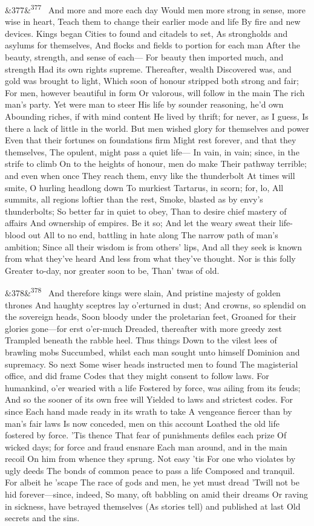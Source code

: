 \documentclass[12pt]{article}
\newcommand{\para}[1][]{\par\noindent\ifx&#1&\else\textsuperscript{\footnotesize #1}~\fi}
\begin{document}
\para[377] And more and more each day Would men more strong in sense, more wise in heart, Teach them to change their earlier mode and life By fire and new devices. Kings began Cities to found and citadels to set, As strongholds and asylums for themselves, And flocks and fields to portion for each man After the beauty, strength, and sense of each--- For beauty then imported much, and strength Had its own rights supreme. Thereafter, wealth Discovered was, and gold was brought to light, Which soon of honour stripped both strong and fair; For men, however beautiful in form Or valorous, will follow in the main The rich man's party. Yet were man to steer His life by sounder reasoning, he'd own Abounding riches, if with mind content He lived by thrift; for never, as I guess, Is there a lack of little in the world. But men wished glory for themselves and power Even that their fortunes on foundations firm Might rest forever, and that they themselves, The opulent, might pass a quiet life--- In vain, in vain; since, in the strife to climb On to the heights of honour, men do make Their pathway terrible; and even when once They reach them, envy like the thunderbolt At times will smite, O hurling headlong down To murkiest Tartarus, in scorn; for, lo, All summits, all regions loftier than the rest, Smoke, blasted as by envy's thunderbolts; So better far in quiet to obey, Than to desire chief mastery of affairs And ownership of empires. Be it so; And let the weary sweat their life-blood out All to no end, battling in hate along The narrow path of man's ambition; Since all their wisdom is from others' lips, And all they seek is known from what they've heard And less from what they've thought. Nor is this folly Greater to-day, nor greater soon to be, Than' twas of old.

\para[378] And therefore kings were slain, And pristine majesty of golden thrones And haughty sceptres lay o'erturned in dust; And crowns, so splendid on the sovereign heads, Soon bloody under the proletarian feet, Groaned for their glories gone---for erst o'er-much Dreaded, thereafter with more greedy zest Trampled beneath the rabble heel. Thus things Down to the vilest lees of brawling mobs Succumbed, whilst each man sought unto himself Dominion and supremacy. So next Some wiser heads instructed men to found The magisterial office, and did frame Codes that they might consent to follow laws. For humankind, o'er wearied with a life Fostered by force, was ailing from its feuds; And so the sooner of its own free will Yielded to laws and strictest codes. For since Each hand made ready in its wrath to take A vengeance fiercer than by man's fair laws Is now conceded, men on this account Loathed the old life fostered by force. 'Tis thence That fear of punishments defiles each prize Of wicked days; for force and fraud ensnare Each man around, and in the main recoil On him from whence they sprung. Not easy 'tis For one who violates by ugly deeds The bonds of common peace to pass a life Composed and tranquil. For albeit he 'scape The race of gods and men, he yet must dread 'Twill not be hid forever---since, indeed, So many, oft babbling on amid their dreams Or raving in sickness, have betrayed themselves (As stories tell) and published at last Old secrets and the sins.
\end{document}
